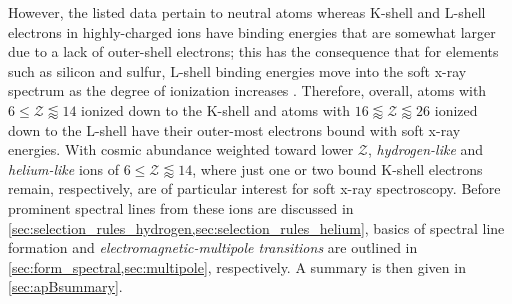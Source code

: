 However, the listed data pertain to neutral atoms \cite{Attwood17} whereas K-shell and L-shell electrons in highly-charged ions have binding energies that are somewhat larger due to a lack of outer-shell electrons; this has the consequence that for elements such as silicon and sulfur, L-shell binding energies move into the soft x-ray spectrum as the degree of ionization increases \cite{Kahn02,Paerels03}. 
Therefore, overall, atoms with $6 \leq \mathcal{Z} \lessapprox 14$ ionized down to the K-shell and atoms with $16 \lessapprox \mathcal{Z} \lessapprox 26$ ionized down to the L-shell have their outer-most electrons bound with soft x-ray energies. 
With cosmic abundance weighted toward lower $\mathcal{Z}$, \emph{hydrogen-like} and \emph{helium-like} ions of $6 \leq \mathcal{Z} \lessapprox 14$, where just one or two bound K-shell electrons remain, respectively, are of particular interest for soft x-ray spectroscopy. 
Before prominent spectral lines from these ions are discussed in \cref{sec:selection_rules_hydrogen,sec:selection_rules_helium}, basics of spectral line formation and \emph{electromagnetic-multipole transitions} are outlined in \cref{sec:form_spectral,sec:multipole}, respectively. 
A summary is then given in \cref{sec:apBsummary}. 

